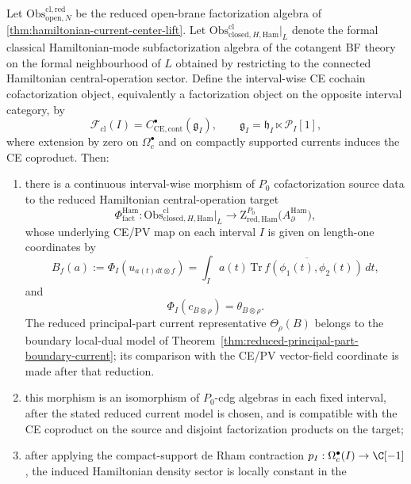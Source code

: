 \documentclass[11pt]{memoir}
\begin{document}
\begin{thm}\label{thm:hamiltonian-current-factorization}
  Let $\mathrm{Obs}^{\mathrm{cl,red}}_{\mathrm{open},N}$ be the reduced
  open-brane factorization algebra of
  \ref{thm:hamiltonian-current-center-lift}. Let
  $\mathrm{Obs}^{\mathrm{cl}}_{\mathrm{closed},H,\mathrm{Ham}}|_{L}$
  denote the formal classical Hamiltonian-mode subfactorization
  algebra of the cotangent BF theory on the formal neighbourhood of
  \(L\) obtained by restricting to the connected Hamiltonian
  central-operation sector. Define the interval-wise CE cochain
  cofactorization object, equivalently a factorization object on the
  opposite interval category, by
  $$\mathcal F_{\mathrm{cl}}(I)
    =C^\bullet_{\mathrm{CE},\mathrm{cont}}(\mathfrak g_I),\qquad
    \mathfrak g_I=\mathfrak h_I\ltimes\mathcal P_I[1],$$
  where extension by zero on \(\Omega_c^\bullet\) and on compactly
  supported currents induces the CE coproduct. Then:
  \begin{enumerate}
    \item there is a continuous interval-wise morphism of $P_0$
      cofactorization source data to the reduced Hamiltonian
      central-operation target
      $$\Phi^{\mathrm{Ham}}_{\mathrm{fact}}:
        \mathrm{Obs}^{\mathrm{cl}}_{\mathrm{closed},H,\mathrm{Ham}}\big|_{L}
        \longrightarrow
        \mathrm Z^{P_0}_{\mathrm{red,Ham}}\bigl(A_\partial^{\mathrm{Ham}}\bigr),$$
      whose underlying CE/PV map on each interval \(I\) is given on
      length-one coordinates by
      $$B_f(a):=\Phi_I(u_{a(t)dt\otimes f})
        =\int_I a(t)\,\overline{\mathrm{Tr}\,f(\phi_1(t),\phi_2(t))}\,dt,$$
      and
      $$\Phi_I(c_{B\otimes\rho})=\theta_{B\otimes\rho}.$$
      The reduced principal-part current representative
      \(\Theta_\rho(B)\) belongs to the boundary local-dual model of
      Theorem~\ref{thm:reduced-principal-part-boundary-current}; its
      comparison with the CE/PV vector-field coordinate is made after
      that reduction.
    \item this morphism is an isomorphism of \(P_0\)-cdg algebras in
      each fixed interval, after the stated reduced current model is
      chosen, and is compatible with the CE coproduct on the source and
      disjoint factorization products on the target;
    \item after applying the compact-support de Rham contraction
      \(p_I:\Omega_c^\bullet(I)\to\C[-1]\), the induced Hamiltonian
      density sector is locally constant in the

\end{enumerate}
\end{thm}
\end{document}
